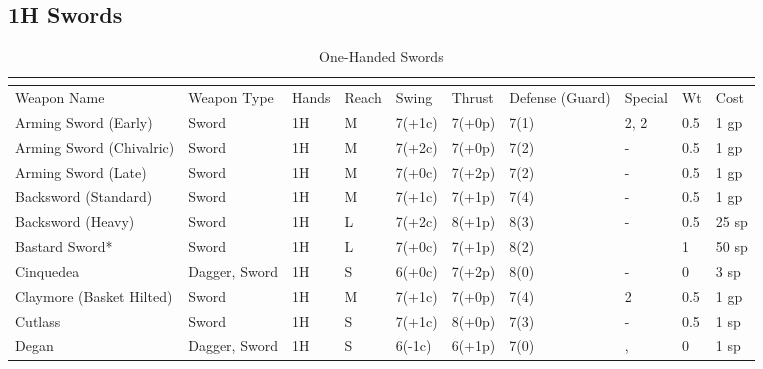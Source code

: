 \documentclass[oneside,11pt,english]{book}
\begin{document}
\subsection{1H Swords}\vspace{-15pt}
\begin{longtabu} to 1\linewidth {X[2,l]XX[-1,c]X[-1,c]XXX[-1,c]X[2,l]X[-3,c]X[-3,r]}
	\captionsetup{labelformat=blank,textformat=empty}
	\caption{One-Handed Swords}\vspace{-15pt}
	\label{tab:1H Swords}\\\endfirsthead
Weapon Name					&Weapon Type    &Hands   &Reach  &Swing  &Thrust &Defense (Guard)  &Special                                 &Wt  &Cost\\\toprule\endhead
Arming Sword (Early)        &Sword          &1H      &M      &7(+1c) &7(+0p) &7(1)           & 2,  2                 &0.5 &1 gp\\
Arming Sword (Chivalric)    &Sword          &1H      &M      &7(+2c) &7(+0p) &7(2)           &-                                       &0.5 &1 gp\\
Arming Sword (Late)         &Sword          &1H      &M      &7(+0c) &7(+2p) &7(2)           &-                                       &0.5 &1 gp\\
Backsword (Standard)        &Sword          &1H      &M      &7(+1c) &7(+1p) &7(4)           &-                                       &0.5 &1 gp\\
Backsword (Heavy)           &Sword          &1H      &L      &7(+2c) &8(+1p) &8(3)           &-                                       &0.5 &25 sp\\
Bastard Sword*              &Sword          &1H      &L      &7(+0c) &7(+1p) &8(2)           &                            &1   &50 sp\\
Cinquedea                   &Dagger, Sword  &1H      &S      &6(+0c) &7(+2p) &8(0)           &-                                       &0   &3 sp\\
Claymore (Basket Hilted)	&Sword		&1H      &M      &7(+1c) &7(+0p) &7(4)           & 2                           &0.5 &1 gp\\
Cutlass						&Sword          &1H      &S      &7(+1c) &8(+0p) &7(3)           &-                                       &0.5 &1 sp\\
Degan&Dagger, Sword  &1H      &S      &6(-1c) &6(+1p) &7(0)           &,               &0   &1 sp\\

\end{longtabu}
\end{document}
